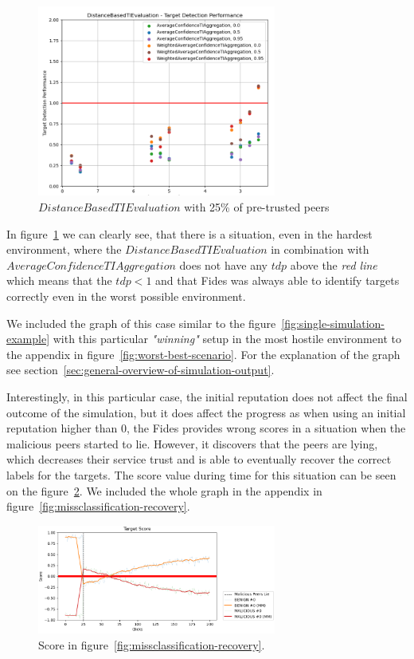 \begin{figure}[h]
    \centering
    \includegraphics[width=0.7\textwidth]{assets/25_distance_detection_detail.png}
    \caption{$DistanceBasedTIEvaluation$ with 25\% of pre-trusted peers}
    \label{fig:distance-detection-detail-25}
\end{figure}

In figure~\ref{fig:distance-detection-detail-25} we can clearly see, that there is a situation, even in the hardest environment, where the $DistanceBasedTIEvaluation$ in combination with $AverageConfidenceTIAggregation$ does not have any $tdp$ above the \textit{red line} which means that the $tdp < 1$ and that Fides was always able to identify targets correctly even in the worst possible environment.

We included the graph of this case similar to the figure~\ref{fig:single-simulation-example} with this particular \textit{"winning"} setup in the most hostile environment to the appendix in figure~\ref{fig:worst-best-scenario}. For the explanation of the graph see section~\ref{sec:general-overview-of-simulation-output}.

Interestingly, in this particular case, the initial reputation does not affect the final outcome of the simulation, but it does affect the progress as when using an initial reputation higher than $0$, the Fides provides wrong scores in a situation when the malicious peers started to lie.
However, it discovers that the peers are lying, which decreases their service trust and is able to eventually recover the correct labels for the targets.
The score value during time for this situation can be seen on the figure~\ref{fig:missclassification-score-only}.
We included the whole graph in the appendix in figure~\ref{fig:missclassification-recovery}.

\begin{figure}[h]
    \centering
    \includegraphics[width=0.7\textwidth]{assets/misclassification_score.png}
    \caption{Score in figure~\ref{fig:missclassification-recovery}.}
    \label{fig:missclassification-score-only}
\end{figure}

